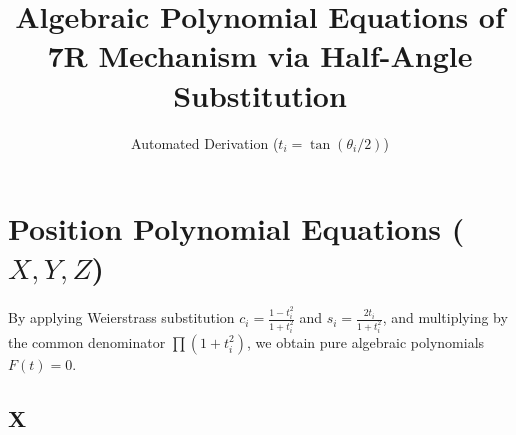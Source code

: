 \documentclass[10pt,landscape]{article}
\begin{document}
\title{Algebraic Polynomial Equations of 7R Mechanism via Half-Angle Substitution}
\author{Automated Derivation ($t_i = \tan(\theta_i/2)$)}
\maketitle

\section*{Position Polynomial Equations ($X, Y, Z$)}
By applying Weierstrass substitution $c_i = \frac{1-t_i^2}{1+t_i^2}$ and $s_i = \frac{2t_i}{1+t_i^2}$, and multiplying by the common denominator $\prod (1+t_i^2)$, we obtain pure algebraic polynomials $F(t) = 0$.

\subsection*{ X}
\end{document}
